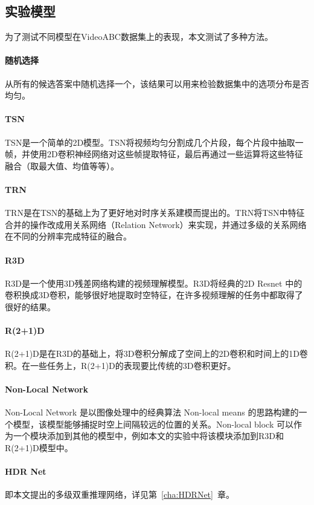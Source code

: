 \subsection{实验模型}
为了测试不同模型在VideoABC数据集上的表现，本文测试了多种方法。
\paragraph{随机选择} 从所有的候选答案中随机选择一个，该结果可以用来检验数据集中的选项分布是否均匀。
\paragraph{TSN\cite{wang2016temporal}}TSN是一个简单的2D模型。TSN将视频均匀分割成几个片段，每个片段中抽取一帧，并使用2D卷积神经网络对这些帧提取特征，最后再通过一些运算将这些特征融合（取最大值、均值等等）。

\paragraph{TRN\cite{zhou2018temporal}} TRN是在TSN的基础上为了更好地对时序关系建模而提出的。TRN将TSN中特征合并的操作改成用关系网络（Relation Network）来实现，并通过多级的关系网络在不同的分辨率完成特征的融合。

\paragraph{R3D\cite{tran2018closer}} R3D是一个使用3D残差网络构建的视频理解模型。R3D将经典的2D Resnet 中的卷积换成3D卷积，能够很好地提取时空特征，在许多视频理解的任务中都取得了很好的结果。

\paragraph{R(2+1)D\cite{tran2018closer}} R(2+1)D是在R3D的基础上，将3D卷积分解成了空间上的2D卷积和时间上的1D卷积。在一些任务上，R(2+1)D的表现要比传统的3D卷积更好。

\paragraph{Non-Local Network\cite{wang2018non}} Non-Local Network 是以图像处理中的经典算法 Non-local means 的思路构建的一个模型，该模型能够捕捉时空上间隔较远的位置的关系。Non-local block 可以作为一个模块添加到其他的模型中，例如本文的实验中将该模块添加到R3D和R(2+1)D模型中。

\paragraph{HDR Net} 即本文提出的多级双重推理网络，详见第~\ref{cha:HDRNet}~章。
